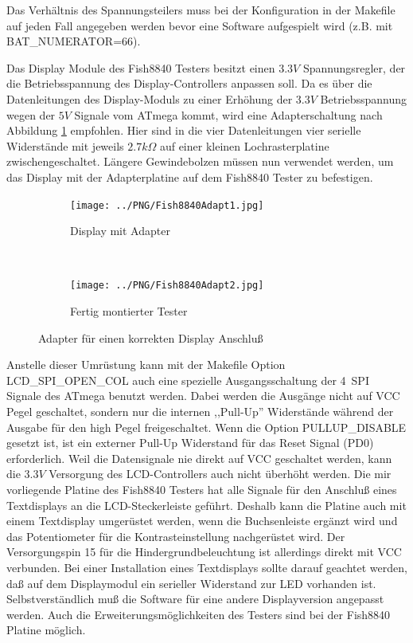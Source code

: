 Das Verhältnis des Spannungsteilers muss bei der Konfiguration in der Makefile auf jeden Fall angegeben
werden bevor eine Software aufgespielt wird (z.B. mit BAT\_NUMERATOR=66).

Das Display Module des Fish8840 Testers besitzt einen \(3.3V\) Spannungsregler, der die Betriebsspannung
des Display-Controllers anpassen soll.
Da es über die Datenleitungen des Display-Moduls zu einer Erhöhung der \(3.3V\) Betriebsspannung wegen
der \(5V\) Signale vom ATmega kommt,
wird eine Adapterschaltung nach Abbildung \ref{fig:Fish8840Adapt} empfohlen. Hier sind in die vier
Datenleitungen vier serielle Widerstände mit jeweils \(2.7k\Omega\) auf einer kleinen Lochrasterplatine
zwischengeschaltet.
Längere Gewindebolzen müssen nun verwendet werden, um das Display mit der Adapterplatine auf dem
Fish8840 Tester zu befestigen.

\begin{figure}[H]
  \begin{subfigure}[b]{9cm}
    \centering
    \texttt{[image: ../PNG/Fish8840Adapt1.jpg]}
    \caption{Display mit Adapter}
  \end{subfigure}
  ~
  \begin{subfigure}[b]{9cm}
    \centering
    \texttt{[image: ../PNG/Fish8840Adapt2.jpg]}
    \caption{Fertig montierter Tester}
  \end{subfigure}
  \caption{Adapter für einen korrekten Display Anschluß}
  \label{fig:Fish8840Adapt}
\end{figure}

Anstelle dieser Umrüstung kann mit der Makefile Option LCD\_SPI\_OPEN\_COL auch eine spezielle Ausgangsschaltung
der 4~SPI Signale des ATmega benutzt werden.
Dabei werden die Ausgänge nicht auf VCC Pegel geschaltet,
sondern nur die internen ,,Pull-Up'' Widerstände während der Ausgabe für den high Pegel freigeschaltet.
Wenn die Option PULLUP\_DISABLE gesetzt ist, ist ein externer Pull-Up Widerstand für das
Reset Signal (PD0) erforderlich.
Weil die Datensignale nie direkt auf VCC geschaltet werden, kann die \(3.3V\) Versorgung des LCD-Controllers
auch nicht überhöht werden.
Die mir vorliegende Platine des Fish8840 Testers hat alle Signale für den Anschluß eines
Textdisplays an die LCD-Steckerleiste geführt. 
Deshalb kann die Platine auch mit einem Textdisplay umgerüstet werden, wenn die Buchsenleiste
ergänzt wird und das Potentiometer für die Kontrasteinstellung nachgerüstet wird.
Der Versorgungspin 15 für die Hindergrundbeleuchtung ist allerdings direkt mit VCC verbunden.
Bei einer Installation eines Textdisplays sollte darauf geachtet werden, daß auf dem Displaymodul
ein serieller Widerstand zur LED vorhanden ist.
Selbstverständlich muß die Software für eine andere Displayversion angepasst werden.
Auch die Erweiterungsmöglichkeiten des Testers sind bei der Fish8840 Platine möglich.\\

